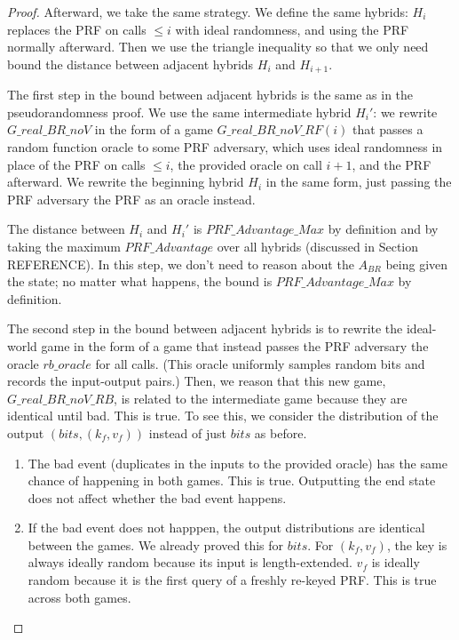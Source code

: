 \documentclass[12pt,lot, lof]{puthesis}
\begin{document}
{\begin{proof}
Afterward, we take the same strategy. We define the same hybrids: $H_i$ replaces the PRF on calls $\leq i$ with ideal randomness, and using the PRF normally afterward. Then we use the triangle inequality so that we only need bound the distance between adjacent hybrids $H_i$ and $H_{i+1}$.

The first step in the bound between adjacent hybrids is the same as in the pseudorandomness proof. We use the same intermediate hybrid $H_i'$: we rewrite $G\_real\_BR\_noV$ in the form of a game $G\_real\_BR\_noV\_RF(i)$ that passes a random function oracle to some PRF adversary, which uses ideal randomness in place of the PRF on calls $\leq i$, the provided oracle on call $i+1$, and the PRF afterward. We rewrite the beginning hybrid $H_i$ in the same form, just passing the PRF adversary the PRF as an oracle instead.

The distance between $H_i$ and $H_i'$ is $PRF\_Advantage\_Max$ by definition and by taking the maximum $PRF\_Advantage$ over all hybrids (discussed in Section REFERENCE). In this step, we don't need to reason about the $A_{BR}$ being given the state; no matter what happens, the bound is $PRF\_Advantage\_Max$ by definition.

The second step in the bound between adjacent hybrids is to rewrite the ideal-world game in the form of a game that instead passes the PRF adversary the oracle $rb\_oracle$ for all calls. (This oracle uniformly samples random bits and records the input-output pairs.) Then, we reason that this new game, $G\_real\_BR\_noV\_RB$, is related to the intermediate game because they are identical until bad. This is true. To see this, we consider the distribution of the output $(bits, (k_f, v_f))$ instead of just $bits$ as before.

\begin{enumerate}
\item The bad event (duplicates in the inputs to the provided oracle) has the same chance of happening in both games. This is true. Outputting the end state does not affect whether the bad event happens.
\item If the bad event does not happpen, the output distributions are identical between the games. We already proved this for $bits$. For $(k_f, v_f)$, the key is always ideally random because its input is length-extended. $v_f$ is ideally random because it is the first query of a freshly re-keyed PRF. This is true across both games.
\end{enumerate}


\end{proof}}
\end{document}
